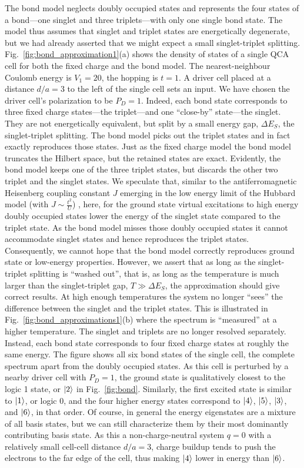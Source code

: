 The bond model neglects doubly occupied states and represents the four states of
a bond---one singlet and three triplets---with only one single bond state. The
model thus assumes that singlet and triplet states are energetically degenerate,
but we had already asserted that we might expect a small singlet-triplet
splitting. Fig.~\ref{fig:bond_approximation1}(a) shows the density of states of
a single QCA cell for both the fixed charge and the bond model. The
nearest-neighbour Coulomb energy is $V_1 = 20$, the hopping is $t=1$. A driver
cell placed at a distance $d/a = 3$ to the left of the single cell sets an
input. We have chosen the driver cell's polarization to be $P_D = 1$. Indeed, each
bond state corresponds to three fixed charge states---the triplet---and one
``close-by'' state---the singlet. They are not energetically equivalent, but
split by a small energy gap, $\Delta E_S$, the singlet-triplet splitting. The
bond model picks out the triplet states and in fact exactly reproduces those
states. Just as the fixed charge model the bond model truncates the Hilbert
space, but the retained states are exact. Evidently, the bond model keeps one of
the three triplet states, but discards the other two triplet and the singlet
states. We speculate that, similar to the antiferromagnetic Heisenberg coupling
constant $J$ emerging in the low energy limit of the Hubbard model (with $J \sim
\frac{t^2}{U}$) \cite{Auerbach}, here, for the ground state virtual excitations
to high energy doubly occupied states lower the energy of the singlet state
compared to the triplet state. As the bond model misses those doubly occupied
states it cannot accommodate singlet states and hence reproduces the triplet
states. Consequently, we cannot hope that the bond model correctly reproduces
ground state or low-energy properties. However, we assert that as long as the
singlet-triplet splitting is ``washed out'', that is, as long as the temperature
is much larger than the singlet-triplet gap, $T \gg \Delta E_S$, the
approximation should give correct results. At high enough temperatures the
system no longer ``sees'' the difference between the singlet and the triplet
states. This is illustrated in Fig.~\ref{fig:bond_approximations1}(b) where the
spectrum is ``measured'' at a higher temperature. The singlet and triplets are
no longer resolved separately.  Instead, each bond state corresponds to four
fixed charge states at roughly the same energy. The figure shows all six bond
states of the single cell, the complete spectrum apart from the doubly occupied
states. As this cell is perturbed by a nearby driver cell with $P_D = 1$, the
ground state is qualitatively closest to the logic 1 state, or $\left|2\right>$ in
Fig.~\ref{fig:bond}.  Similarly, the first excited state is similar to
$\left|1\right>$, or logic 0, and the four higher energy states correspond to
$\left|4\right>$, $\left|5\right>$, $\left|3\right>$, and $\left|6\right>$, in that order. Of course, in
general the energy eigenstates are a mixture of all basis states, but we can
still characterize them by their most dominantly contributing basis state. As
this a non-charge-neutral system $q=0$ with a relatively small cell-cell
distance $d/a = 3$, charge buildup tends to push the electrons to the far edge
of the cell, thus making $\left|4\right>$ lower in energy than $\left|6\right>$.

